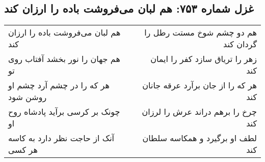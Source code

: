 \begin{center}
\section*{غزل شماره ۷۵۳: هم لبان می‌فروشت باده را ارزان کند}
\label{sec:0753}
\begin{longtable}{l p{0.5cm} r}
هم لبان می‌فروشت باده را ارزان کند
&&
هم دو چشم شوخ مستت رطل را گردان کند
\\
هم جهان را نور بخشد آفتاب روی تو
&&
زهر را تریاق سازد کفر را ایمان کند
\\
هر که را در چشم آرد چشم او روشن شود
&&
هر که را از جان برآرد عرقه جانان کند
\\
چونک بر کرسی برآید پادشاه روح او
&&
چرخ را برهم دراند عرش را لرزان کند
\\
آنک از حاجت نظر دارد به کاسه هر کسی
&&
لطف او برگیرد و همکاسه سلطان کند
\\
\end{longtable}
\end{center}
